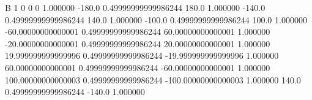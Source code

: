 


B		1
0	0	0	1.000000
-180.0	0.49999999999986244	180.0	1.000000
-140.0	0.49999999999986244	140.0	1.000000
-100.0	0.49999999999986244	100.0	1.000000
-60.00000000000001	0.49999999999986244	60.00000000000001	1.000000
-20.00000000000001	0.49999999999986244	20.00000000000001	1.000000
19.999999999999996	0.49999999999986244	-19.999999999999996	1.000000
60.00000000000001	0.49999999999986244	-60.00000000000001	1.000000
100.00000000000003	0.49999999999986244	-100.00000000000003	1.000000
140.0	0.49999999999986244	-140.0	1.000000
